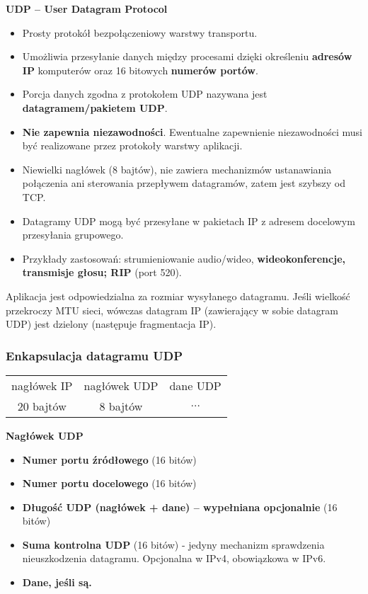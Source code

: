 \documentclass[../main.tex]{subfiles}
\begin{document}
    \textbf{UDP – User Datagram Protocol}
    \begin{itemize}
        \item Prosty protokół bezpołączeniowy warstwy transportu.
        \item Umożliwia przesyłanie danych między procesami dzięki określeniu \textbf{adresów IP} komputerów oraz 16 bitowych \textbf{numerów portów}.
        \item Porcja danych zgodna z protokołem UDP nazywana jest \textbf{datagramem/pakietem UDP}.
        \item \textbf{Nie zapewnia niezawodności}. Ewentualne zapewnienie niezawodności musi być realizowane przez protokoły warstwy aplikacji.
        \item Niewielki nagłówek (8 bajtów), nie zawiera mechanizmów ustanawiania połączenia ani sterowania przepływem datagramów, zatem jest szybszy od TCP.
        \item Datagramy UDP mogą być przesyłane w pakietach IP z adresem docelowym przesyłania grupowego.
        \item Przykłady zastosowań: strumieniowanie audio/wideo, \textbf{wideokonferencje, transmisje głosu; RIP} (port 520).
    \end{itemize}

    Aplikacja jest odpowiedzialna za rozmiar wysyłanego datagramu. Jeśli wielkość przekroczy
    MTU sieci, wówczas datagram IP (zawierający w sobie datagram UDP) jest dzielony
    (następuje fragmentacja IP).


    \subsubsection{Enkapsulacja datagramu UDP}

\begin{adjustbox}{center}
    \begin{tabular}{|c|c|c|}
        \hline
        nagłówek IP & nagłówek UDP & dane UDP\\
        20 bajtów & 8 bajtów & $\dots$\\
        \hline
    \end{tabular}
\end{adjustbox}

    \textbf{Nagłówek UDP}
    \begin{itemize}
        \item \textbf{Numer portu źródłowego} (16 bitów)
        \item \textbf{Numer portu docelowego} (16 bitów)
        \item \textbf{Długość UDP (nagłówek + dane) – wypełniana opcjonalnie} (16 bitów)
        \item \textbf{Suma kontrolna UDP} (16 bitów) - jedyny mechanizm sprawdzenia nieuszkodzenia datagramu. Opcjonalna w IPv4, obowiązkowa w IPv6.
        \item \textbf{Dane, jeśli są.}
    \end{itemize}
\end{document}
